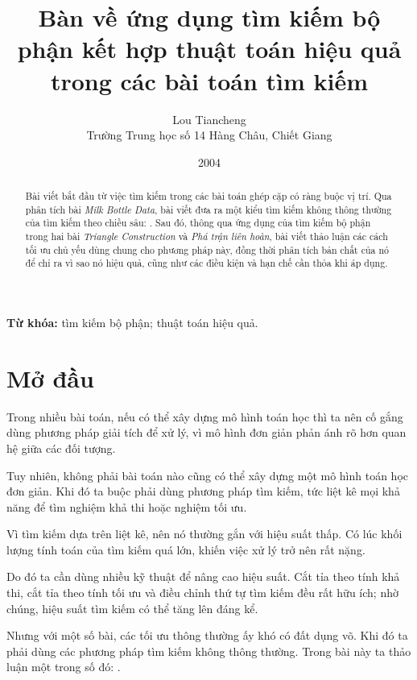 \documentclass[11pt]{article}
\title{Bàn về ứng dụng tìm kiếm bộ phận kết hợp thuật toán hiệu quả trong các bài toán tìm kiếm}
\author{Lou Tiancheng\\Trường Trung học số 14 Hàng Châu, Chiết Giang}
\date{2004}
\begin{document}
\maketitle


\begin{abstract}
Bài viết bắt đầu từ việc tìm kiếm trong các bài toán ghép cặp có ràng buộc
vị trí. Qua phân tích bài \textit{Milk Bottle Data}, bài viết đưa ra một kiểu
tìm kiếm không thông thường của tìm kiếm theo chiều sâu: . Sau đó, thông qua ứng dụng của tìm kiếm bộ phận
trong hai bài \textit{Triangle Construction} và \textit{Phá trận liên hoàn},
bài viết thảo luận các cách tối ưu chủ yếu dùng chung
cho phương pháp này, đồng thời phân tích bản chất của nó để chỉ ra vì sao nó
hiệu quả, cũng như các điều kiện và hạn chế cần thỏa khi áp dụng.
\end{abstract}

\noindent\textbf{Từ khóa:} tìm kiếm bộ phận; thuật toán hiệu quả.

\section{Mở đầu}

Trong nhiều bài toán, nếu có thể xây dựng mô hình toán học thì ta nên cố gắng
dùng phương pháp giải tích để xử lý, vì mô hình đơn giản phản ánh rõ hơn quan
hệ giữa các đối tượng.

Tuy nhiên, không phải bài toán nào cũng có thể xây dựng một mô hình toán học
đơn giản. Khi đó ta buộc phải dùng phương pháp tìm kiếm, tức liệt kê mọi khả
năng để tìm nghiệm khả thi hoặc nghiệm tối ưu.

Vì tìm kiếm dựa trên liệt kê, nên nó thường gắn với hiệu suất thấp. Có lúc
khối lượng tính toán của tìm kiếm quá lớn, khiến việc xử lý trở nên rất nặng.

Do đó ta cần dùng nhiều kỹ thuật để nâng cao hiệu suất. Cắt tỉa theo tính khả
thi, cắt tỉa theo tính tối ưu và điều chỉnh thứ tự tìm kiếm đều rất hữu ích;
nhờ chúng, hiệu suất tìm kiếm có thể tăng lên đáng kể.

Nhưng với một số bài, các tối ưu thông thường ấy khó có đất dụng võ. Khi đó ta
phải dùng các phương pháp tìm kiếm không thông thường. Trong bài này ta thảo
luận một trong số đó: .
\end{document}
